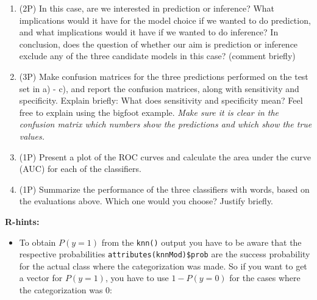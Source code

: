 \documentclass[
]{article}
\newenvironment{Shaded}{\begin{snugshade}}{\end{snugshade}}
\newcommand{\DecValTok}[1]{\textcolor[rgb]{0.00,0.00,0.81}{#1}}
\newcommand{\FunctionTok}[1]{\textcolor[rgb]{0.00,0.00,0.00}{#1}}
\newcommand{\NormalTok}[1]{#1}
\newcommand{\OtherTok}[1]{\textcolor[rgb]{0.56,0.35,0.01}{#1}}
\newcommand{\SpecialCharTok}[1]{\textcolor[rgb]{0.00,0.00,0.00}{#1}}
\providecommand{\tightlist}{%
  \setlength{\itemsep}{0pt}\setlength{\parskip}{0pt}}
\begin{document}
\begin{enumerate}
\def\labelenumi{\roman{enumi})}
\item
  (2P) In this case, are we interested in prediction or inference? What
  implications would it have for the model choice if we wanted to do
  prediction, and what implications would it have if we wanted to do
  inference? In conclusion, does the question of whether our aim is
  prediction or inference exclude any of the three candidate models in
  this case? (comment briefly)
\item
  (3P) Make confusion matrices for the three predictions performed on
  the test set in a) - c), and report the confusion matrices, along with
  sensitivity and specificity. Explain briefly: What does sensitivity
  and specificity mean? Feel free to explain using the bigfoot example.
  \emph{Make sure it is clear in the confusion matrix which numbers show
  the predictions and which show the true values.}
\item
  (1P) Present a plot of the ROC curves and calculate the area under the
  curve (AUC) for each of the classifiers.
\item
  (1P) Summarize the performance of the three classifiers with words,
  based on the evaluations above. Which one would you choose? Justify
  briefly.
\end{enumerate}

\textbf{R-hints:}

\begin{itemize}
\tightlist
\item
  To obtain \(P(y=1)\) from the \texttt{knn()} output you have to be
  aware that the respective probabilities
  \texttt{attributes(knnMod)\$prob} are the success probability for the
  actual class where the categorization was made. So if you want to get
  a vector for \(P(y=1)\), you have to use \(1-P(y=0)\) for the cases
  where the categorization was 0:
\end{itemize}

\begin{Shaded}
\end{Shaded}
\end{document}
